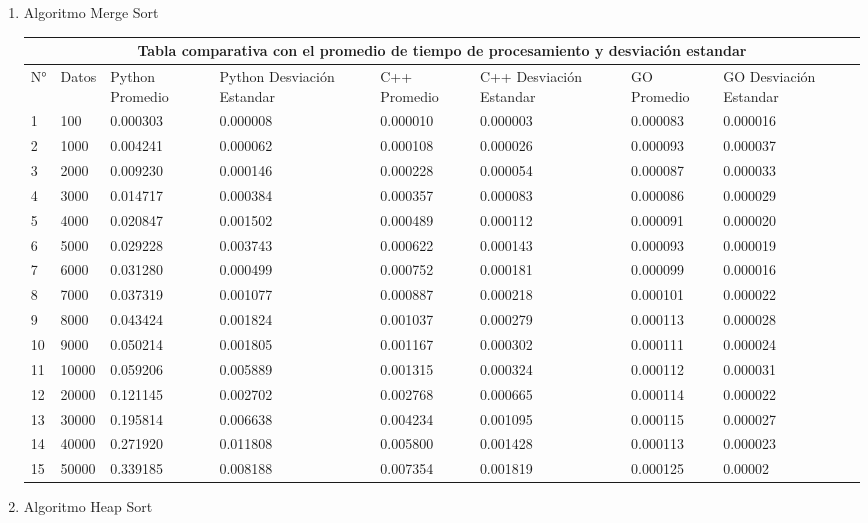 \documentclass{article}
\begin{document}
\begin{enumerate}
        
        
        \item Algoritmo Merge Sort
        
 \begin{tabular}{ |p{0.3cm}||p{0.9cm}|p{1.5cm}|p{1.7cm}|p{1.5cm}|p{1.7cm}|p{1.8cm}|p{1.7cm}|  }
 \hline
 \multicolumn{8}{|c|}{Tabla comparativa con el promedio de tiempo de procesamiento y desviación estandar} \\
 \hline
 N°& Datos &Python Promedio &Python Desviación Estandar &C++ Promedio &C++ Desviación Estandar &GO Promedio &GO Desviación Estandar\\
 \hline
1	&100	&0.000303	&0.000008	&0.000010	&0.000003	&0.000083	&0.000016\\
2	&1000	&0.004241	&0.000062	&0.000108	&0.000026	&0.000093	&0.000037\\
3	&2000	&0.009230	&0.000146	&0.000228	&0.000054	&0.000087	&0.000033\\
4	&3000	&0.014717	&0.000384	&0.000357	&0.000083	&0.000086	&0.000029\\
5	&4000	&0.020847	&0.001502	&0.000489	&0.000112	&0.000091	&0.000020\\
6	&5000	&0.029228	&0.003743	&0.000622	&0.000143	&0.000093	&0.000019\\
7	&6000	&0.031280	&0.000499	&0.000752	&0.000181	&0.000099	&0.000016\\
8	&7000	&0.037319	&0.001077	&0.000887	&0.000218	&0.000101	&0.000022\\
9	&8000	&0.043424	&0.001824	&0.001037	&0.000279	&0.000113	&0.000028\\
10	&9000	&0.050214	&0.001805	&0.001167	&0.000302	&0.000111	&0.000024\\
11	&10000	&0.059206	&0.005889	&0.001315	&0.000324	&0.000112	&0.000031\\
12	&20000	&0.121145	&0.002702	&0.002768	&0.000665	&0.000114	&0.000022\\
13	&30000	&0.195814	&0.006638	&0.004234	&0.001095	&0.000115	&0.000027\\
14	&40000	&0.271920	&0.011808	&0.005800	&0.001428	&0.000113	&0.000023\\
15	&50000	&0.339185	&0.008188	&0.007354	&0.001819	&0.000125	&0.00002\\

\hline
\end{tabular}
        
        \item Algoritmo Heap Sort
	

\end{enumerate}
\end{document}
